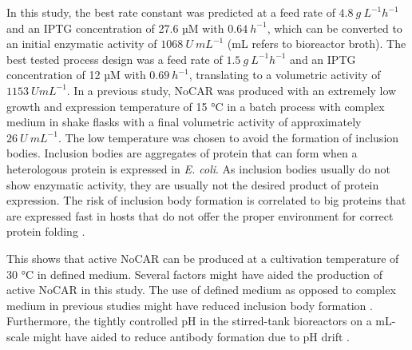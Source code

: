 \documentclass[sn-standardnature]{sn-jnl}%
\theoremstyle{thmstyleone}%
\theoremstyle{thmstyletwo}%
\theoremstyle{thmstylethree}%
\begin{document}
In this study, the best rate constant was predicted at a feed rate of $4.8\ g\ L^{-1} h^{-1}$ and an IPTG concentration of 27.6 µM with $0.64\ h^{-1}$, which can be converted to an initial enzymatic activity of $1068\ U\ mL^{-1}$ (mL refers to bioreactor broth).
The best tested process design was a feed rate of $1.5\ g\ L^{-1} h^{-1}$ and an IPTG concentration of 12 µM with $0.69\ h^{-1}$, translating to a volumetric activity of $1153\ UmL^{-1}$.
In a previous study, NoCAR was produced with an extremely low growth and expression temperature of 15 °C in a batch process with complex medium in shake flasks with a final volumetric activity of approximately $26\ U\ mL^{-1}$\cite{weber2021production}.
The low temperature was chosen to avoid the formation of inclusion bodies.
Inclusion bodies are aggregates of protein that can form when a heterologous protein is expressed in \textit{E. coli}.
As inclusion bodies usually do not show enzymatic activity, they are usually not the desired product of protein expression.
The risk of inclusion body formation is correlated to big proteins that are expressed fast in hosts that do not offer the proper environment for correct protein folding \cite{bhatwa2021challenges,neubauer2001expression,fahnert2004inclusion}.

This shows that active NoCAR can be produced at a cultivation temperature of 30 °C in defined medium. Several factors might have aided the production of active NoCAR in this study.
The use of defined medium as opposed to complex medium in previous studies might have reduced inclusion body formation \cite{neubauer2001expression,fahnert2004inclusion}.
Furthermore, the tightly controlled pH in the stirred-tank bioreactors on a mL-scale might have aided to reduce antibody formation due to pH drift \cite{strandberg1991factors}.
\end{document}
